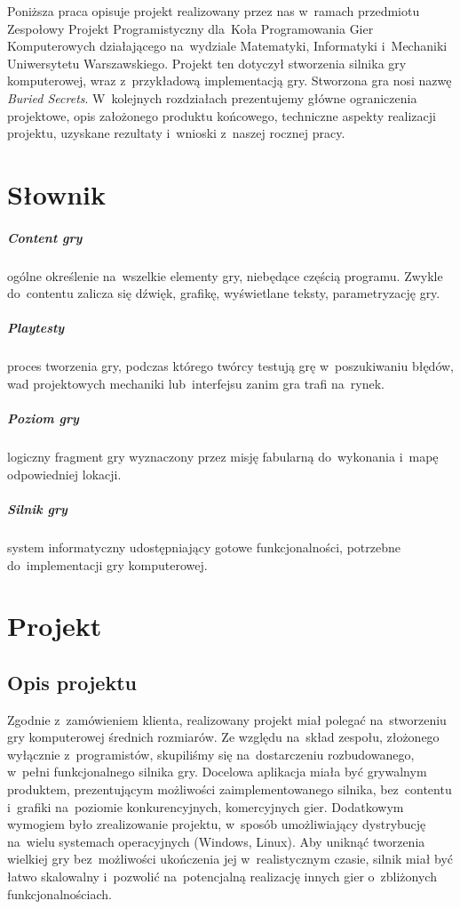 \documentclass[licencjacka]{pracamgr}
\begin{document}
  Poniższa praca opisuje projekt realizowany przez nas w~ramach przedmiotu Zespołowy Projekt Programistyczny dla~Koła Programowania
  Gier Komputerowych działającego na~wydziale Matematyki, Informatyki i~Mechaniki Uniwersytetu Warszawskiego.
  Projekt ten dotyczył stworzenia silnika gry komputerowej, wraz z~przykładową implementacją gry. Stworzona gra nosi nazwę
  \emph{Buried Secrets}. W~kolejnych rozdziałach prezentujemy główne ograniczenia projektowe, opis założonego produktu końcowego,
  techniczne aspekty realizacji projektu, uzyskane rezultaty i~wnioski z~naszej rocznej pracy.


\chapter{Słownik}
  \paragraph{Content gry} ogólne określenie na~wszelkie elementy gry, niebędące częścią programu. Zwykle do~contentu zalicza się
    dźwięk, grafikę, wyświetlane teksty, parametryzację gry.
  \paragraph{Playtesty} proces tworzenia gry, podczas którego twórcy testują grę w~poszukiwaniu błędów, wad projektowych mechaniki
    lub~interfejsu zanim gra trafi na~rynek.
  \paragraph{Poziom gry} logiczny fragment gry wyznaczony przez misję fabularną do~wykonania i~mapę odpowiedniej lokacji.
  \paragraph{Silnik gry} system informatyczny udostępniający gotowe funkcjonalności, potrzebne do~implementacji gry komputerowej.

\chapter{Projekt}

  \section{Opis projektu}
    Zgodnie z~zamówieniem klienta, realizowany projekt miał polegać na~stworzeniu gry komputerowej
    średnich rozmiarów. Ze względu na~skład zespołu, złożonego wyłącznie z~programistów, skupiliśmy się
    na~dostarczeniu rozbudowanego, w~pełni funkcjonalnego silnika gry.
    Docelowa aplikacja miała być grywalnym produktem, prezentującym możliwości zaimplementowanego silnika,
    bez~contentu i~grafiki na~poziomie konkurencyjnych, komercyjnych gier. Dodatkowym wymogiem było zrealizowanie
    projektu, w~sposób umożliwiający dystrybucję na~wielu systemach operacyjnych (Windows, Linux). Aby uniknąć
    tworzenia wielkiej gry bez~możliwości ukończenia jej w~realistycznym czasie, silnik miał być łatwo skalowalny
    i~pozwolić na~potencjalną realizację innych gier o~zbliżonych funkcjonalnościach.
\end{document}
